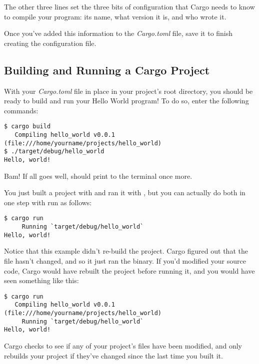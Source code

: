 \blank

The other three lines set the three bits of configuration that Cargo needs to know to compile your program: its name, what 
version it is, and who wrote it.

\blank

Once you've added this information to the \emph{Cargo.toml} file, save it to finish creating the configuration file.

\subsection*{Building and Running a Cargo Project}

With your \emph{Cargo.toml} file in place in your project's root directory, you should be ready to build and run your 
Hello World program! To do so, enter the following commands:

\begin{verbatim}
$ cargo build
   Compiling hello_world v0.0.1 (file:///home/yourname/projects/hello_world)
$ ./target/debug/hello_world
Hello, world! 
\end{verbatim}

Bam! If all goes well,  should print to the terminal once more.

\blank

You just built a project with  and ran it with , but you can actually do 
both in one step with  run as follows:

\begin{verbatim}
$ cargo run
     Running `target/debug/hello_world`
Hello, world!  
\end{verbatim}

Notice that this example didn't re-build the project. Cargo figured out that the file hasn't changed, and so it just 
ran the binary. If you'd modified your source code, Cargo would have rebuilt the project before running it, and you 
would have seen something like this:

\begin{verbatim}
$ cargo run
   Compiling hello_world v0.0.1 (file:///home/yourname/projects/hello_world)
     Running `target/debug/hello_world`
Hello, world!  
\end{verbatim}

Cargo checks to see if any of your project's files have been modified, and only rebuilds your project if they've changed since 
the last time you built it.

